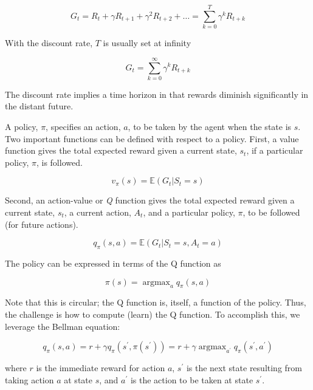 \documentclass[acmlarge,screen]{acmart}
\DeclareMathOperator*{\argmax}{argmax}
\begin{document}
\begin{equation}
  G_t = R_t + \gamma R_{t+1} + \gamma^2 R_{t+2} + \ldots = \sum_{k=0}^T \gamma^k R_{t+k} 
\end{equation}

With the discount rate, $T$ is usually set at infinity

\begin{equation}
  G_t = \sum_{k=0}^\infty \gamma^k R_{t+k} 
\end{equation}

The discount rate implies a time horizon in that rewards diminish significantly in the distant future.

A policy, $\pi$, specifies an action, $a$, to be taken by the agent when the state is $s$.  
Two important functions can be defined with respect to a policy.
First, a value function gives the total expected reward given a current state, $s_t$, 
if a particular policy, $\pi$, is followed.

\begin{equation}
  v_\pi (s) = \mathbb{E} \left( G_t \vert S_t = s \right)
\end{equation}

Second, an action-value or \textit{Q} function gives the total expected reward given a current state, $s_t$, 
a current action, $A_t$,
and a particular policy, $\pi$, to be followed (for future actions).

\begin{equation}
  q_\pi (s,a) = \mathbb{E} \left( G_t \vert S_t = s, A_t = a \right)
\end{equation}

The policy can be expressed in terms of the Q function as

\begin{equation}
  \pi(s) = \argmax_a q_\pi (s,a)
\end{equation}

Note that this is circular;  the Q function is, itself, a function of the policy.  
Thus, the challenge is how to compute (learn) the Q function.
To accomplish this, we leverage the Bellman equation:

\begin{equation} \label{eq:tempdiff1}
  q_\pi (s,a) = r + \gamma q_\pi (s^\prime, \pi(s^\prime)) = r + \gamma \argmax_{a^\prime} q_\pi (s^\prime, a^\prime)
\end{equation}

\noindent where $r$ is the immediate reward for action $a$, $s^\prime$ is the next state resulting from taking
action $a$ at state $s$, and $a^\prime$ is the action to be taken at state $s^\prime$.
\end{document}
